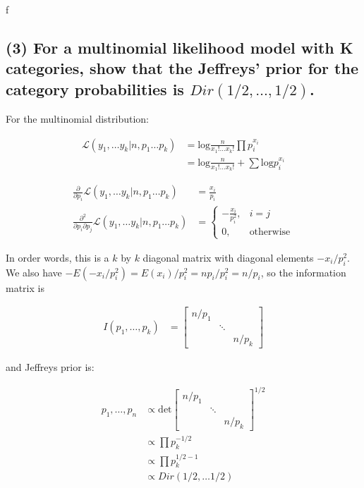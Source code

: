 \documentclass[11pt]{article}
\begin{document}
f

\subsection*{(3) For a multinomial likelihood model with K categories, show that the Jeffreys’ prior for the category probabilities is $Dir(1/2, \ldots, 1/2)$.}

For the multinomial distribution:

\begin{align*}
   \mathcal{L}(y_1, \ldots y_k| n, p_1 \ldots p_k) &= \text{log} \frac{n}{x_1! \ldots x_k!} \prod p_i^{x_i}\\
   &= \text{log} \frac{n}{x_1! \ldots x_k!}  + \sum \text{log} p_i^{x_i}
\end{align*}


\begin{align*}
   \frac{\partial}{\partial p_i}\mathcal{L}(y_1, \ldots y_k| n, p_1 \ldots p_k) 
   &=   \frac{x_i}{p_i}\\
   \frac{\partial^2}{\partial p_i \partial p_j}\mathcal{L}(y_1, \ldots y_k| n, p_1 \ldots p_k) &= \begin{cases}
  -\frac{x_i}{p_i^2},  &  i = j \\
  0, & \text{otherwise}
\end{cases}
\end{align*}

In order words, this is a $k$ by $k$ diagonal matrix with diagonal elements $ -x_i/p_i^2$. We also have $-E(-x_i/p_i^2)  = E(x_i)/p_i^2 = n p_i/p_i^2 = n/p_i$, so the information matrix is

\begin{align*}
    I(p_1, \dots, p_k) &=  \begin{bmatrix}
    n/p_1 & & \\
    & \ddots & \\
    & & n/p_k
  \end{bmatrix}
\end{align*}

and Jeffreys prior is:

\begin{align*}
    p_1, 
    \ldots, p_n&\propto \text{det}\begin{bmatrix}
    n/p_1 & & \\
    & \ddots & \\
    & & n/p_k
  \end{bmatrix}^{1/2}\\
  &\propto \prod p_k^{-1/2}\\
  &\propto \prod p_k^{1/2-1}\\
  &\propto Dir(1/2, \dots 1/2)
\end{align*}
\end{document}
